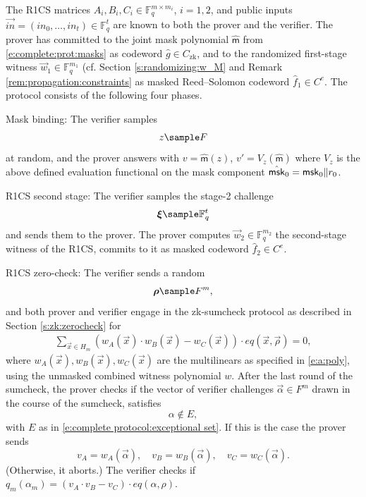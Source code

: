 \begin{protocol}[zk-IOPP]
\label{prot:complete}
The R1CS matrices $A_i,B_i,C_i \in \mathbb F_q^{m\times m_i}$, $i=1,2$, and public inputs $\vec{in} = (in_0,\ldots, in_{t})\in \mathbb F_q^t$ are known to both the prover and the verifier. 
The prover has committed to \textcolor{PineGreen}{the joint mask polynomial $\hat{\mathsf m}$ from \eqref{e:complete:prot:masks} as codeword $\hat g\in C_\text{zk}$}, and to the \textcolor{PineGreen}{randomized} first-stage witness $\vec w_1\in \mathbb F_q^{m_1}$ \textcolor{PineGreen}{(cf. Section \ref{s:randomizing:w_M} and Remark \ref{rem:propagation:constraints}} as \textcolor{PineGreen}{masked} Reed--Solomon codeword $\hat f_1\in C^e$. 
The protocol consists of the following four phases.
\begin{enumerate}
\setcounter{enumi}{-1}
\textcolor{PineGreen}{
\item 
Mask binding: 
\label{i:zk:phase:0}
The verifier samples 
\[
z\sample F
\]
at random, and the prover answers with $v = \hat{\mathsf m}(z)$, $v' = V_z(\hat{\mathsf m})$ where $V_z$ is the above defined evaluation functional on the mask component $\hat{\mathsf{msk}}_0 = \mathsf{msk}_0\|r_0$.
}

\item
\label{i:zk:phase:1}
R1CS second stage:
The verifier samples the stage-2 challenge
\[
\vec\xi \sample \mathbb F_q^{t}
\]
and sends them to the prover.
The prover computes $\vec w_2 \in \mathbb F_q^{m_2}$  the second-stage witness of the R1CS, commits to it as \textcolor{PineGreen}{masked} codeword $\hat f_2\in C^e$.

\item 
\label{i:zk:phase:2}
R1CS zero-check:
The verifier sends a random 
\[
\vec\rho \sample F^m,
\]
and both prover and verifier engage in the \textcolor{PineGreen}{zk-sumcheck protocol as described in Section \ref{s:zk:zerocheck}} for 
\begin{align}
\label{e:R1CS:zerocheck}
\sum_{\vec x\in H_m} \left(w_A(\vec x)\cdot w_B(\vec x) - w_C(\vec x)\right)\cdot eq(\vec x, \vec\rho) = 0,
\end{align}
where $w_A(\vec x), w_B(\vec x), w_C(\vec x)$ are the multilinears as specified in \eqref{e:a:poly}, using the unmasked combined witness polynomial $w$. 
After the last round of the sumcheck, \textcolor{PineGreen}{the prover checks if the vector of verifier challenges $\vec\alpha\in F^m$ drawn in the course of the sumcheck, satisfies
\begin{equation}
\label{e:alph:notin:E}
\alpha \notin E,
\end{equation}
with $E$ as in  \eqref{e:complete protocol:exceptional set}.}
If this is the case the prover sends 
\begin{equation*}
v_A = w_A(\vec\alpha),  \quad v_B = w_B(\vec\alpha), \quad v_C = w_C(\vec\alpha).
\end{equation*}
\textcolor{PineGreen}{(Otherwise, it aborts.)}
The verifier checks if $q_m(\alpha_m) = (v_A\cdot v_B - v_C) \cdot eq(\alpha,\rho)$.


\end{enumerate}
\end{protocol}
